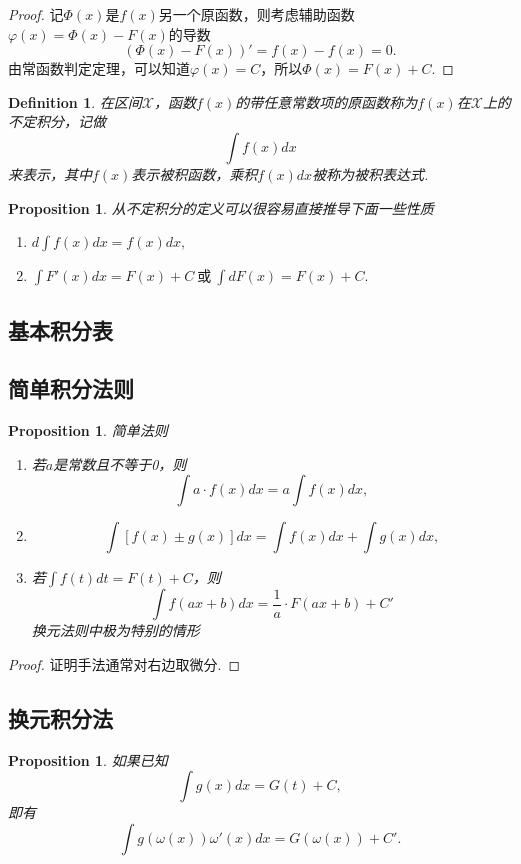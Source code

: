 \documentclass{article}
\newtheorem{proposition}[theorem]{Proposition}
\newtheorem{definition}[theorem]{Definition}
\begin{document}
\begin{proof}
记$\Phi(x)$是$f(x)$另一个原函数，则考虑辅助函数$\varphi(x) = \Phi(x) - F(x)$的导数
$$
(\Phi(x)-F(x))' = f(x)-f(x) = 0.
$$
由常函数判定定理，可以知道$\varphi(x) = C$，所以$\Phi(x) = F(x) + C$.
\end{proof}

\begin{definition}
\rm 在区间$\mathcal{X}$，函数$f(x)$的带任意常数项的原函数称为$f(x)$在$\mathcal{X}$上的{\color{red}不定积分}，记做
$$
\int f(x)dx
$$
来表示，其中$f(x)$表示{\color{red}被积函数}，乘积$f(x)dx$被称为{\color{red}被积表达式}.
\end{definition}

\begin{proposition}
\rm 从不定积分的定义可以很容易直接推导下面一些性质
\begin{enumerate}
	\item $d\int f(x)dx = f(x)dx,$
	\item $\int F'(x)dx = F(x)+C~\text{或}~\int dF(x) = F(x)+C.$
\end{enumerate}
\end{proposition}


\subsection{基本积分表}

\subsection{简单积分法则}

\begin{proposition}
\rm 简单法则
\begin{enumerate}
	\item 若$a$是常数且不等于0，则
	$$
	\int a\cdot f(x)dx = a \int f(x)dx,
	$$
	\item 
	$$
	\int \left[ f(x) \pm  g(x) \right]dx = \int f(x)dx + \int g(x)dx,
	$$
	\item 若$\int f(t)dt = F(t)+C$，则
	$$
	\int f(ax+b)dx = \frac{1}{a}\cdot F(ax+b)+C'
	$$
	{\color{red} 换元法则中极为特别的情形}
\end{enumerate}
\end{proposition}

\begin{proof}
{\color{blue}证明手法通常对右边取微分}.
\end{proof}


\subsection{换元积分法}
\begin{proposition}
\rm 如果已知
$$
\int g(x)dx = G(t)+C,
$$
即有
$$
\int g(\omega(x))\omega'(x)dx = G(\omega(x)) + C'.
$$
\end{proposition}
\end{document}
